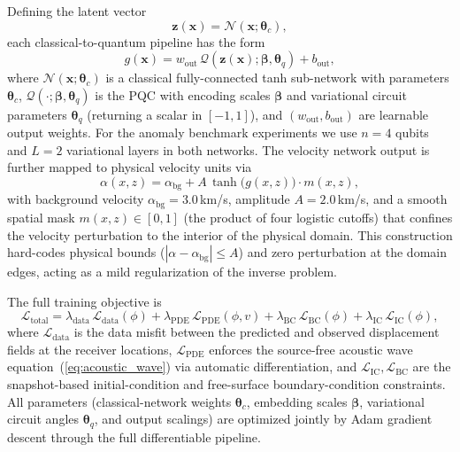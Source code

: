\documentclass[11pt,a4paper]{article}
\begin{document}
Defining the latent vector
\begin{equation}
    \mathbf{z}(\mathbf{x}) = \mathcal{N}(\mathbf{x}; \boldsymbol{\theta}_c),
\end{equation}
each classical-to-quantum pipeline has the form
\begin{equation}
    g(\mathbf{x}) = w_\text{out}\, \mathcal{Q}\!\left(\mathbf{z}(\mathbf{x}); \boldsymbol{\beta}, \boldsymbol{\theta}_q\right) + b_\text{out},
\end{equation}
where $\mathcal{N}(\mathbf{x}; \boldsymbol{\theta}_c)$ is a classical fully-connected tanh sub-network with parameters $\boldsymbol{\theta}_c$, $\mathcal{Q}(\cdot; \boldsymbol{\beta}, \boldsymbol{\theta}_q)$ is the PQC with encoding scales $\boldsymbol{\beta}$ and variational circuit parameters $\boldsymbol{\theta}_q$ (returning a scalar in $[-1,1]$), and $(w_\text{out}, b_\text{out})$ are learnable output weights. For the anomaly benchmark experiments we use $n = 4$ qubits and $L = 2$ variational layers in both networks. The velocity network output is further mapped to physical velocity units via
\begin{equation}
    \alpha(x,z) = \alpha_\text{bg} + A\, \tanh\!\big(g(x,z)\big) \cdot m(x,z),
    \label{eq:velocity_output}
\end{equation}
with background velocity $\alpha_\text{bg} = 3.0$\,km/s, amplitude $A = 2.0$\,km/s, and a smooth spatial mask $m(x,z) \in [0,1]$ (the product of four logistic cutoffs) that confines the velocity perturbation to the interior of the physical domain. This construction hard-codes physical bounds ($|\alpha - \alpha_\text{bg}| \leq A$) and zero perturbation at the domain edges, acting as a mild regularization of the inverse problem.

The full training objective is
\begin{equation}
\mathcal{L}_\text{total}
= \lambda_\text{data}\,\mathcal{L}_\text{data}(\phi)
+ \lambda_\text{PDE}\,\mathcal{L}_\text{PDE}(\phi, v)
+ \lambda_\text{BC}\,\mathcal{L}_\text{BC}(\phi)
+ \lambda_\text{IC}\,\mathcal{L}_\text{IC}(\phi),
\end{equation}
where $\mathcal{L}_\text{data}$ is the data misfit between the predicted and observed displacement fields at the receiver locations, $\mathcal{L}_\text{PDE}$ enforces the source-free acoustic wave equation~(\ref{eq:acoustic_wave}) via automatic differentiation, and $\mathcal{L}_\text{IC}, \mathcal{L}_\text{BC}$ are the snapshot-based initial-condition and free-surface boundary-condition constraints. All parameters (classical-network weights $\boldsymbol{\theta}_c$, embedding scales $\boldsymbol{\beta}$, variational circuit angles $\boldsymbol{\theta}_q$, and output scalings) are optimized jointly by Adam gradient descent through the full differentiable pipeline.
\end{document}
